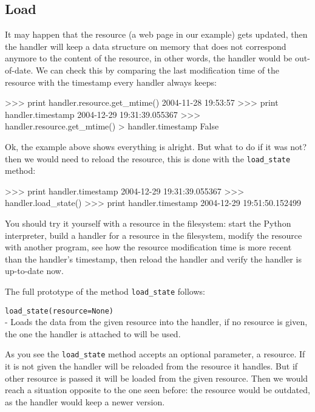 \subsection{Load}

It may happen that the resource (a web page in our example) gets updated, then
the handler will keep a data structure on memory that does not correspond
anymore to the content of the resource, in other words, the handler would
be out-of-date. We can check this by comparing the last modification time of
the resource with the timestamp every handler always keeps:

\begin{code}
    >>> print handler.resource.get_mtime()
    2004-11-28 19:53:57
    >>> print handler.timestamp
    2004-12-29 19:31:39.055367
    >>> handler.resource.get_mtime() > handler.timestamp
    False
\end{code}

Ok, the example above shows everything is alright. But what to do if it was
not? then we would need to reload the resource, this is done with the
{\tt load\_state} method:

\begin{code}
    >>> print handler.timestamp
    2004-12-29 19:31:39.055367
    >>> handler.load_state()
    >>> print handler.timestamp
    2004-12-29 19:51:50.152499
\end{code}

You should try it yourself with a resource in the filesystem: start the
Python interpreter, build a handler for a resource in the filesystem,
modify the resource with another program, see how the resource
modification time is more recent than the handler's timestamp, then reload
the handler and verify the handler is up-to-date now.

The full prototype of the method {\tt load\_state} follows:

\begin{api}
  {\tt load\_state(resource=None)}\\
  - Loads the data from the given resource into the handler, if no
    resource is given, the one the handler is attached to will be used.
\end{api}

As you see the {\tt load\_state} method accepts an optional parameter, a
resource. If it is not given the handler will be reloaded from the resource
it handles. But if other resource is passed it will be loaded from the given
resource. Then we would reach a situation opposite to the one seen before:
the resource would be outdated, as the handler would keep a newer version.


